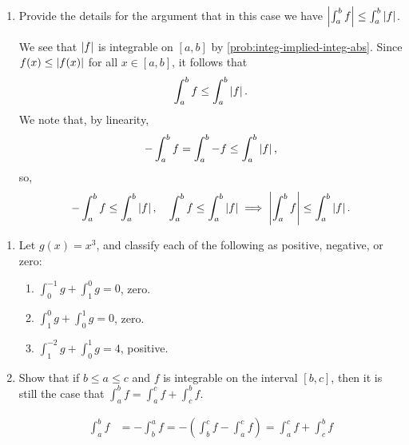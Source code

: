 \begin{problem}
\begin{enumerate}[label=(\alph*)]
    \item Provide the details for the argument that in this case we have
      $\left\lvert \int_{a}^{b} f \right\rvert \leq \int_{a}^{b} \left\lvert f \right\rvert$.

      We see that $\left\lvert f \right\rvert$ is integrable on $[a, b]$ by \ref{prob:integ-implied-integ-abs}.
      Since $f(x) \leq \left\lvert f(x) \right\rvert$ for all $x \in [a, b]$, it follows that
      \[
        \int_{a}^{b} f \leq \int_{a}^{b} \left\lvert f \right\rvert.
      \]
      We note that, by linearity,
      \[
        -\int_{a}^{b} f = \int_{a}^{b} -f \leq \int_{a}^{b} \left\lvert f \right\rvert,
      \]
      so,
      \[
        -\int_{a}^{b} f \leq \int_{a}^{b} \left\lvert f \right\rvert, \quad \int_{a}^{b} f \leq \int_{a}^{b} \left\lvert f \right\rvert \implies 
        \left\lvert \int_{a}^{b} f \right\rvert \leq \int_{a}^{b} \left\lvert f \right\rvert.
      \]

  \end{enumerate}

\end{problem}

\begin{problem}
  \begin{enumerate}[label=(\alph*)]
    \item Let $g(x) = x^{3}$, and classify each of the following as positive, negative, or zero:
      \begin{enumerate}[label=(\roman*)]
        \item $\int_{0}^{-1} g + \int_{1}^{0} g = 0$, zero.

        \item $\int_{1}^{0} g + \int_{0}^{1} g = 0$, zero. 

        \item $\int_{1}^{-2} g + \int_{0}^{1} g = 4$, positive.

      \end{enumerate}

    \item Show that if $b \leq a \leq c$ and $f$ is integrable on the interval
      $[b,c]$, then it is still the case that $\int_{a}^{b} f = \int_{a}^{c} f + \int_{c}^{b} f$.

      \begin{align*} 
        \int_{a}^{b} f &= -\int_{b}^{a} f = -\left( \int_{b}^{c} f - \int_{a}^{c} f \right) =\int_{a}^{c} f + \int_{c}^{b} f
      \end{align*}

  \end{enumerate}
\end{problem}

